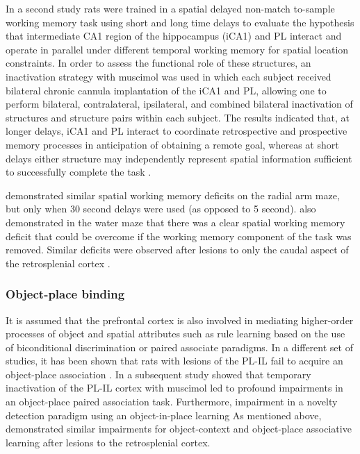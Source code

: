 \documentclass[doc, longtable]{apa6}
\begin{document}
In a second study rats were trained in a spatial delayed non-match to-sample working memory task using short and long time delays to evaluate the hypothesis that intermediate CA1 region of the hippocampus (iCA1) and PL interact and operate in parallel under different temporal working memory for spatial location constraints. In order to assess the functional role of these structures, an inactivation strategy with muscimol was used in which each subject received bilateral chronic cannula implantation of the iCA1 and PL, allowing one to perform bilateral, contralateral, ipsilateral, and combined bilateral inactivation of structures and structure pairs within each subject. The results indicated that, at longer delays, iCA1 and PL interact to coordinate retrospective and prospective memory processes in anticipation of obtaining a remote goal, whereas at short delays either structure may independently represent spatial information sufficient to successfully complete the task \parencite{Churchwell2011a} .

\textcite{Keene2009a} demonstrated similar spatial working memory deficits on the radial arm maze, but only when 30 second delays were used (as opposed to 5 second). \textcite{vann2004testing} also demonstrated in the water maze that there was a clear spatial working memory deficit that could be overcome if the working memory component of the task was removed. Similar deficits were observed after lesions to only the caudal aspect of the retrosplenial cortex \parencite{Vann2003a}.

\subsubsection{Object-place binding}
It is assumed that the prefrontal cortex is also involved in mediating higher-order processes of object and spatial attributes such as rule learning based on the use of biconditional discrimination or paired associate paradigms. In a different set of studies, it has been shown that rats with lesions of the PL-IL fail to acquire an object-place association \parencite{Kesner2003b}. In a subsequent study \textcite{Lee2008a} showed that temporary inactivation of the PL-IL cortex with muscimol led to profound impairments in an object-place paired association task. Furthermore, impairment in a novelty detection paradigm using an object-in-place learning As mentioned above, \textcite{Vann2002a} demonstrated similar impairments for object-context and object-place associative learning after lesions to the retrosplenial cortex.
\end{document}
